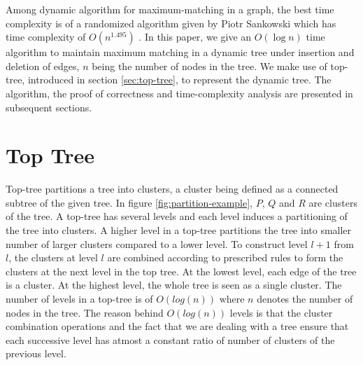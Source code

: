 \documentclass[a4paper,12pt]{article}
\begin{document}
Among dynamic algorithm for maximum-matching in a graph, the best time complexity is of a randomized algorithm given by Piotr Sankowski which has time complexity of $O(n^{1.495})$ \cite{maxmatch-dynamic}. In this paper, we give an $O(\log n)$ time algorithm to maintain maximum matching in a dynamic tree under insertion and deletion of edges, $n$ being the number of nodes in the tree. We make use of top-tree, introduced in section \ref{sec:top-tree}, to represent the dynamic tree. The algorithm, the proof of correctness and time-complexity analysis are presented in subsequent sections.

\section{\label{sec:top-tree}Top Tree}
Top-tree\cite{werneck} partitions a tree into clusters, a cluster being defined as a connected subtree of the given tree. In figure \ref{fig:partition-example}, $P$, $Q$ and $R$ are clusters of the tree. A top-tree has several levels and each level induces a partitioning of the tree into clusters. A higher level in a top-tree partitions the tree into smaller number of larger clusters compared to a lower level. To construct level $l+1$ from $l$, the clusters at level $l$ are combined according to prescribed rules to form the clusters at the next level in the top tree. At the lowest level, each edge of the tree is a cluster. At the highest level, the whole tree is seen as a single cluster. The number of levels in a top-tree is of $O(log(n))$ where $n$ denotes the number of nodes in the tree. The reason behind $O(log(n))$ levels is that the cluster combination operations and the fact that we are dealing with a tree ensure that each successive level has atmost a constant ratio of number of clusters of the previous level.
\end{document}
